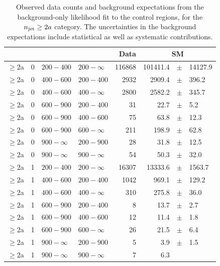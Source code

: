 \clearpage
\begin{table}[!h]
	\caption{
		Observed data counts and background expectations from the 
		background-only likelihood fit to the control regions, for the 
		$n_{\text{jet}}\ge2a$ category. The uncertainties in the background expectations 
		include statistical as well as systematic contributions.  
	}
	\label{tab:cronly_sr_result-ge2a}
	\scriptsize
	\centering
	\begin{tabular}{rrllrrcl}
		\hline
		\njet\T\B & \nb & \scalht [GeV] & \mht [GeV] & Data & 
		\multicolumn{3}{c}{SM} \\ 
		\hline
		$\geq 2${a}\T & 0 & $ 200- 400$ & $200-\infty$ & 116868 & 101411.4 
		&$\pm$& 14127.9 \\
		$\geq 2${a}\T & 0 & $ 400- 600$ & $200-400$ &   2932 &   2909.4 
		&$\pm$&  396.2 \\
		$\geq 2${a} & 0 & $ 400- 600$ & $400-\infty$ &   2800 &   2582.2 
		&$\pm$&  345.7 \\
		$\geq 2${a}\T & 0 & $ 600- 900$ & $200-400$ &     31 &     22.7 
		&$\pm$&    5.2 \\
		$\geq 2${a} & 0 & $ 600- 900$ & $400-600$ &     75 &     63.8 
		&$\pm$&   12.3 \\
		$\geq 2${a} & 0 & $ 600- 900$ & $600-\infty$ &    211 &    198.9 
		&$\pm$&   62.8 \\
		$\geq 2${a}\T & 0 & $ 900- \infty$ & $200-900$ &     28 &     31.8 
		&$\pm$&   12.5 \\
		$\geq 2${a} & 0 & $ 900- \infty$ & $900-\infty$ &     54 &     50.3 
		&$\pm$&   32.0 \\
		$\geq 2${a}\T & 1 & $ 200- 400$ & $200-\infty$ &  16307 &  13333.6 
		&$\pm$& 1563.7 \\
		$\geq 2${a}\T & 1 & $ 400- 600$ & $200-400$ &   1042 &    969.1 
		&$\pm$&  129.2 \\
		$\geq 2${a} & 1 & $ 400- 600$ & $400-\infty$ &    310 &    275.8 
		&$\pm$&   36.0 \\
		$\geq 2${a}\T & 1 & $ 600- 900$ & $200-400$ &      8 &     13.7 
		&$\pm$&    2.7 \\
		$\geq 2${a} & 1 & $ 600- 900$ & $400-600$ &     12 &     11.4 
		&$\pm$&    1.8 \\
		$\geq 2${a} & 1 & $ 600- 900$ & $600-\infty$ &     26 &     21.5 
		&$\pm$&    6.4 \\
		$\geq 2${a}\T & 1 & $ 900- \infty$ & $200-900$ &      5 &      3.9 
		&$\pm$&    1.5 \\
		$\geq 2${a} & 1 & $ 900- \infty$ & $900-\infty$ &      7 &      6.3 

\end{tabular}
\end{table}
